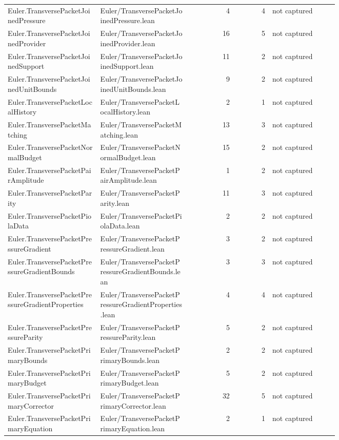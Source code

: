 \documentclass[10pt]{article}
\begin{document}
\begin{longtable}{p{0.28\linewidth}p{0.27\linewidth}r r p{0.20\linewidth}}
Euler.TransversePacketJoinedPressure & Euler/TransversePacketJoinedPressure.lean & 4 & 4 & not captured\\
Euler.TransversePacketJoinedProvider & Euler/TransversePacketJoinedProvider.lean & 16 & 5 & not captured\\
Euler.TransversePacketJoinedSupport & Euler/TransversePacketJoinedSupport.lean & 11 & 2 & not captured\\
Euler.TransversePacketJoinedUnitBounds & Euler/TransversePacketJoinedUnitBounds.lean & 9 & 2 & not captured\\
Euler.TransversePacketLocalHistory & Euler/TransversePacketLocalHistory.lean & 2 & 1 & not captured\\
Euler.TransversePacketMatching & Euler/TransversePacketMatching.lean & 13 & 3 & not captured\\
Euler.TransversePacketNormalBudget & Euler/TransversePacketNormalBudget.lean & 15 & 2 & not captured\\
Euler.TransversePacketPairAmplitude & Euler/TransversePacketPairAmplitude.lean & 1 & 2 & not captured\\
Euler.TransversePacketParity & Euler/TransversePacketParity.lean & 11 & 3 & not captured\\
Euler.TransversePacketPiolaData & Euler/TransversePacketPiolaData.lean & 2 & 2 & not captured\\
Euler.TransversePacketPressureGradient & Euler/TransversePacketPressureGradient.lean & 3 & 2 & not captured\\
Euler.TransversePacketPressureGradientBounds & Euler/TransversePacketPressureGradientBounds.lean & 3 & 3 & not captured\\
Euler.TransversePacketPressureGradientProperties & Euler/TransversePacketPressureGradientProperties.lean & 4 & 4 & not captured\\
Euler.TransversePacketPressureParity & Euler/TransversePacketPressureParity.lean & 5 & 2 & not captured\\
Euler.TransversePacketPrimaryBounds & Euler/TransversePacketPrimaryBounds.lean & 2 & 2 & not captured\\
Euler.TransversePacketPrimaryBudget & Euler/TransversePacketPrimaryBudget.lean & 5 & 2 & not captured\\
Euler.TransversePacketPrimaryCorrector & Euler/TransversePacketPrimaryCorrector.lean & 32 & 5 & not captured\\
Euler.TransversePacketPrimaryEquation & Euler/TransversePacketPrimaryEquation.lean & 2 & 1 & not captured\\

\end{longtable}
\end{document}
